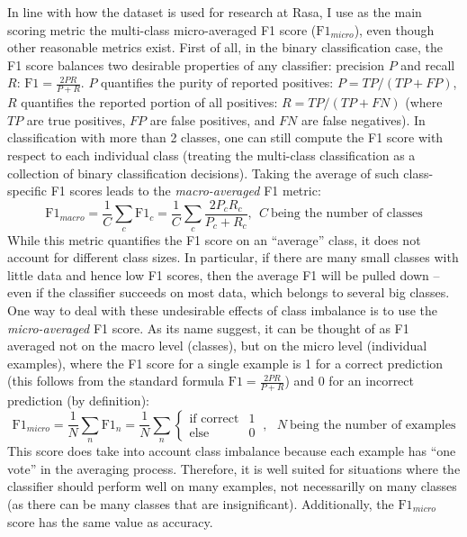 \documentclass[bsc,frontabs,singlespacing,parskip,deptreport]{infthesis}
\begin{document}
{{{      In line with how the dataset is used for research at Rasa, I use as the main scoring metric the multi-class micro-averaged F1 score ($\text{F1}_{micro}$), even though other reasonable metrics exist. First of all, in the binary classification case, the F1 score balances two desirable properties of any classifier: precision $P$ and recall $R$: $\text{F1} = \frac{2 P R}{P+R}$.
      $P$ quantifies the purity of reported positives: $P=TP/(TP+FP)$, $R$ quantifies the reported portion of all positives: $R=TP/(TP+FN)$ (where $TP$ are true positives, $FP$ are false positives, and $FN$ are false negatives).
      In classification with more than 2 classes, one can still compute the F1 score with respect to each individual class (treating the multi-class classification as a collection of binary classification decisions). Taking the average of such class-specific F1 scores leads to the \textit{macro-averaged} F1 metric:
      \begin{equation}
        \text{F1}_{macro} = \frac{1}{C}\sum_c \text{F1}_c = \frac{1}{C}\sum_c \frac{2 P_c R_c}{P_c+R_c}, \ \  C\ \text{being the number of classes}
      \end{equation}
      While this metric quantifies the F1 score on an ``average'' class, it does not account for different class sizes. In particular, if there are many small classes with little data and hence low F1 scores, then the average F1 will be pulled down -- even if the classifier succeeds on most data, which belongs to several big classes.
      One way to deal with these undesirable effects of class imbalance is to use the \textit{micro-averaged} F1 score. As its name suggest, it can be thought of as F1 averaged not on the macro level (classes), but on the micro level (individual examples), where the F1 score for a single example is 1 for a correct prediction (this follows from the standard formula $\text{F1} = \frac{2 P R}{P+R}$) and 0 for an incorrect prediction (by definition):
      \begin{equation}
        \text{F1}_{micro} = \frac{1}{N}\sum_n \text{F1}_n = \frac{1}{N}\sum_n {\begin{cases}\text{if correct} & 1\\ \text{else} & 0\end{cases}}\ ,\ \ \  N\ \text{being the number of examples}
      \end{equation}
      This score does take into account class imbalance because each example has ``one vote'' in the averaging process. Therefore, it is well suited for situations where the classifier should perform well on many examples, not necessarilly on many classes (as there can be many classes that are insignificant).
      Additionally, the $\text{F1}_{micro}$ score has the same value as accuracy.
    }
  }

}
\end{document}
